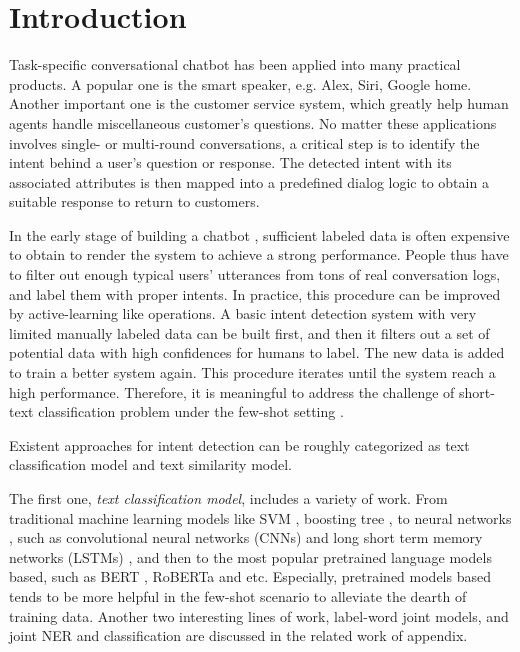 \section{Introduction}
\label{sec:intro}

Task-specific conversational chatbot \cite{wen2016network} has been applied into many practical products. 
A popular one is the smart speaker, e.g. Alex, Siri, Google home. 
Another important one is the customer service system, which greatly help human agents handle miscellaneous customer's questions.
No matter these applications involves single- or multi-round conversations, a critical step is to identify the intent behind a user's question or response. 
The detected intent with its associated attributes is then mapped into a predefined dialog logic to obtain a suitable response to return to customers.

In the early stage of building a chatbot , sufficient labeled data is often expensive to obtain to render the system to achieve a strong performance.
People thus have to filter out enough typical users' utterances from tons of real conversation logs, and label them with proper intents. 
In practice, this procedure can be improved by active-learning like operations. 
A basic intent detection system with very limited manually labeled data can be built first, and then it filters out a set of potential data with high confidences for humans to label.
The new data is added to train a better system again. 
This procedure iterates until the system reach a high performance.
Therefore, it is meaningful to address the challenge of short-text classification \cite{sriram2010short, chen2019deep, phan2008learning,yan2009dynamic,hua2015short} problem under the few-shot setting \cite{yu2018diverse}.

Existent approaches for intent detection can be roughly categorized as text classification model and text similarity model.

The first one, \emph{text classification model}, includes a variety of work.
From traditional machine learning models like SVM \cite{suykens1999least}, boosting tree \cite{tu2005probabilistic}, to neural networks \cite{wen2016network}, such as convolutional neural networks (CNNs) \cite{kim2014convolutional,zhang2015character,conneau2016very} and long short term memory networks (LSTMs) \cite{mousa2017contextual,liu2016recurrent}, and then to the most popular pretrained language models based, such as BERT \cite{devlin2018bert}, RoBERTa \cite{liu2019roberta} and etc. 
Especially, pretrained models based \cite{vaswani2017attention} tends to be more helpful in the few-shot scenario \cite{yu2018diverse, madabushi2020cost} to alleviate the dearth of training data.
Another two interesting lines of work, label-word joint models, and joint NER and classification are discussed in the related work of appendix.

